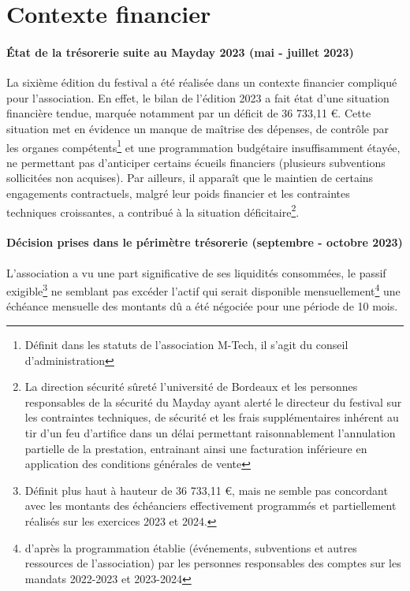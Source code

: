 \documentclass[12pt,a4paper]{report}
\begin{document}
\section*{Contexte financier}
\paragraph*{État de la trésorerie suite au Mayday 2023 (mai - juillet 2023)}
La sixième édition du festival a été réalisée dans un contexte financier compliqué pour l’association. En effet, le bilan de l'édition 2023 a fait état d'une situation financière tendue, marquée notamment par un déficit de 36 733,11 €. Cette situation met en évidence un manque de maîtrise des dépenses, de contrôle par les organes compétents\footnote{Définit dans les statuts de l'association M-Tech, il s'agit du conseil d'administration} et une programmation budgétaire insuffisamment étayée, ne permettant pas d'anticiper certains écueils financiers (plusieurs subventions sollicitées non acquises). Par ailleurs, il apparaît que le maintien de certains engagements contractuels, malgré leur poids financier et les contraintes techniques croissantes, a contribué à la situation déficitaire\footnote{La direction sécurité sûreté l'université de Bordeaux et les personnes responsables de la sécurité du Mayday ayant alerté le directeur du festival sur les contraintes techniques, de sécurité et les frais supplémentaires inhérent au tir d'un feu d'artifice dans un délai permettant raisonnablement l'annulation partielle de la prestation, entrainant ainsi une facturation inférieure en application des conditions générales de vente}.

\paragraph*{Décision prises dans le périmètre trésorerie (septembre - octobre 2023)}
L'association a vu une part significative de ses liquidités consommées, le passif exigible\footnote{Définit plus haut à hauteur de 36 733,11 €, mais ne semble pas concordant avec les montants des échéanciers effectivement programmés et partiellement réalisés sur les exercices 2023 et 2024.} ne semblant pas excéder l'actif qui serait disponible mensuellement\footnote{d'après la programmation établie (événements, subventions et autres ressources de l'association) par les personnes responsables des comptes sur les mandats 2022-2023 et 2023-2024} une échéance mensuelle des montants dû a été négociée pour une période de 10 mois.
\end{document}
